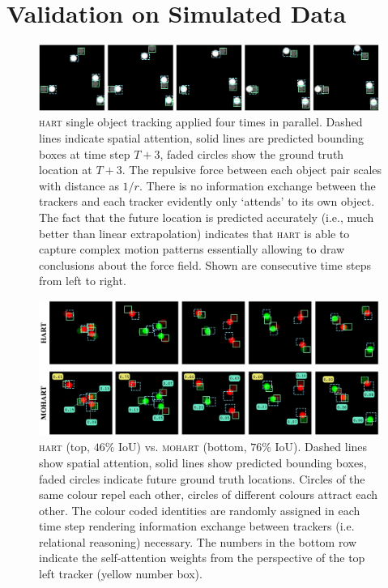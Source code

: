 \section{Validation on Simulated Data} %
\label{sec:experiment_toy}

\begin{figure}%
    \centering
    \includegraphics[width=0.99\textwidth]{figures/MOHART/sot_protons}
    \caption{\textsc{hart} single object tracking applied four times in parallel. Dashed lines indicate spatial attention, solid lines are predicted bounding boxes at time step $T+3$, faded circles show the ground truth location at $T+3$. The repulsive force between each object pair scales with distance as $1/r$. There is no information exchange between the trackers and each tracker evidently only `attends' to its own object. The fact that the future location is predicted accurately (i.e., much better than linear extrapolation) indicates that \textsc{hart} is able to capture complex motion patterns essentially allowing to draw conclusions about the force field. Shown are consecutive time steps from left to right.
    }
    \label{fig:toy1}
\end{figure} 
\begin{figure}%
    \centering
    \includegraphics[width=0.99\textwidth]{figures/MOHART/mot_proel}
    \caption{\textsc{hart} (top, $46\%$ IoU) vs. \textsc{mohart} (bottom, $76\%$ IoU). Dashed lines show spatial attention, solid lines show predicted bounding boxes, faded circles indicate future ground truth locations. Circles of the same colour repel each other, circles of different colours attract each other. The colour coded identities are randomly assigned in each time step rendering information exchange between trackers (i.e. relational reasoning) necessary. The numbers in the bottom row indicate the self-attention weights from the perspective of the top left tracker (yellow number box).
    }
    \label{fig:toy2}
\end{figure}


